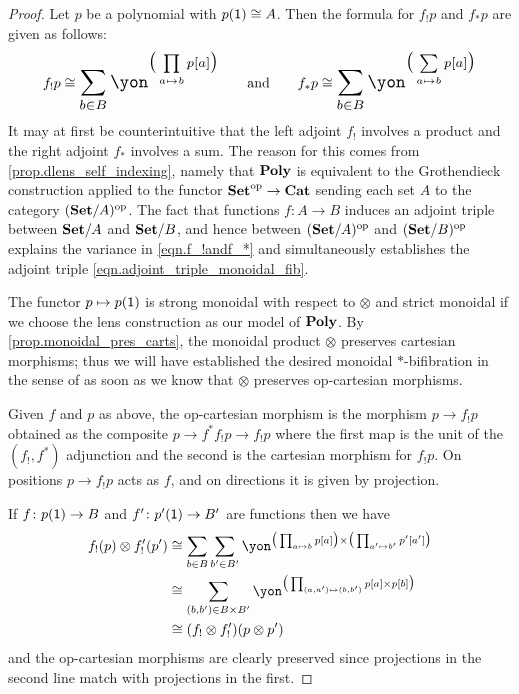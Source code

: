 \documentclass[Book-Poly]{subfiles}
\begin{document}
\begin{proof}
Let $p$ be a polynomial with $p(\textsf{1})\cong A$. Then the formula for $f_!p$ and $f_*p$ are given as follows:
\begin{equation}\label{eqn.f_!andf_*}
f_!p\cong\scalebox{1.3}{$\displaystyle\sum_{b\in B}\yon^{\big(\prod\limits_{a\mapsto b}p[a]\big)}$}
\qqand
f_*p\cong\scalebox{1.3}{$\displaystyle\sum_{b\in B}\yon^{\big(\sum\limits_{a\mapsto b}p[a]\big)}$}
\end{equation}
It may at first be counterintuitive that the left adjoint $f_!$ involves a product and the right adjoint $f_*$ involves a sum. The reason for this comes from \cref{prop.dlens_self_indexing}, namely that $\textbf{Poly}$ is equivalent to the Grothendieck construction applied to the functor $\textbf{Set}^{\textnormal{op}}\to\textbf{Cat}$ sending each set $A$ to the category $(\textbf{Set}/A)^{\textnormal{op}}$. The fact that functions $f\colon A\to B$ induces an adjoint triple between $\textbf{Set}/A$ and $\textbf{Set}/B$, and hence between $(\textbf{Set}/A)^{\textnormal{op}}$ and $(\textbf{Set}/B)^{\textnormal{op}}$ explains the variance in \eqref{eqn.f_!andf_*} and simultaneously establishes the adjoint triple \eqref{eqn.adjoint_triple_monoidal_fib}.

The functor $p\mapsto p(\textsf{1})$ is strong monoidal with respect to $\otimes$ and strict monoidal if we choose the lens construction as our model of $\textbf{Poly}$. By \cref{prop.monoidal_pres_carts}, the monoidal product $\otimes$ preserves cartesian morphisms; thus we will have established the desired monoidal $*$-bifibration in the sense of \cite[Definition 12.1]{shulman2008framed} as soon as we know that $\otimes$ preserves op-cartesian morphisms.

Given $f$ and $p$ as above, the op-cartesian morphism is the morphism $p\to f_!p$ obtained as the composite $p\to f^*f_!p\to f_!p$ where the first map is the unit of the $(f_!,f^*)$ adjunction and the second is the cartesian morphism for $f_!p$. On positions $p\to f_!p$ acts as $f$, and on directions it is given by projection. 

If $f\colon p(\textsf{1})\to B$ and $f'\colon p'(\textsf{1})\to B'$ are functions then we have
\begin{align*}
	f_!(p)\otimes f'_!(p')&\cong
	\sum_{b\in B}\sum_{b'\in B'}\yon^{\big(\prod_{a\mapsto b}p[a]\big)\times\big(\prod_{a'\mapsto b'}p'[a']\big)}\\&\cong
	\sum_{(b,b')\in B\times B'}\yon^{\big(\prod_{(a,a')\mapsto(b,b')}p[a]\times p[b]\big)}\\&
	\cong (f_!\otimes f'_!)(p\otimes p')
\end{align*}
and the op-cartesian morphisms are clearly preserved since projections in the second line match with projections in the first.
\end{proof}
\end{document}
